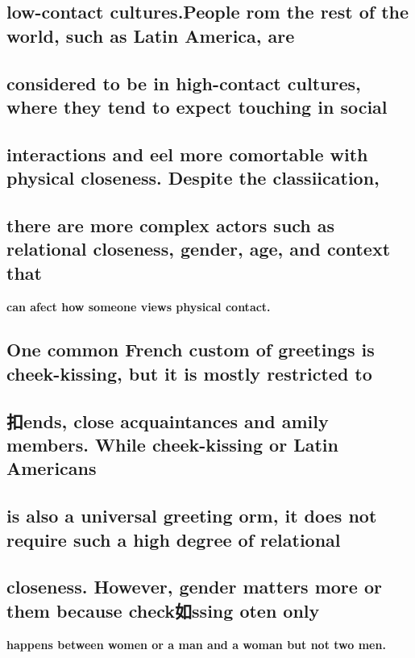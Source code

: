 \documentclass[UTF8,11pt]{ctexart}
\begin{document}
\subsection*{\textbf{low-contact cultures.People rom the rest of the world, such as Latin America, are}}


\subsection*{\textbf{considered to be in high-contact cultures, where they tend to expect touching in social}}


\subsection*{\textbf{interactions and eel more comortable with physical closeness. Despite the classiication,}}


\subsection*{\textbf{there are more complex actors such as relational closeness, gender, age, and context that}}


\textbf{can afect how someone views physical contact.}


\subsection*{\textbf{One common French custom of greetings is cheek-kissing, but it is mostly restricted to}}


\subsection*{\textbf{扣ends, close acquaintances and amily members. While cheek-kissing or Latin Americans}}


\subsection*{\textbf{is also a universal greeting orm, it does not require such a high degree of relational}}


\subsection*{\textbf{closeness. However, gender matters more or them because check如ssing oten only}}


\textbf{happens between women or a man and a woman but not two men.}
\end{document}
